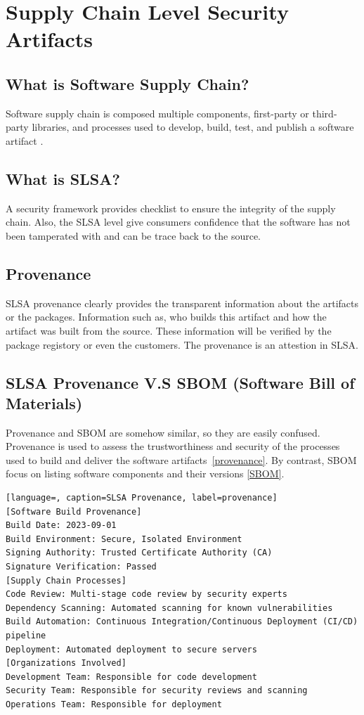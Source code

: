 \section{Supply Chain Level Security Artifacts}

\subsection{What is Software Supply Chain?}
Software supply chain is composed multiple components, first-party or third-
party libraries, and processes used to develop, build, test, and publish a software 
artifact \cite{DoDDefCI/CD2023}.

\subsection{What is SLSA?}
A security framework provides checklist to ensure the integrity of the supply chain.
Also, the SLSA level give consumers confidence that the software has not been tamperated with 
and can be trace back to the source.

\subsection{Provenance}
SLSA provenance clearly provides the transparent information about the artifacts or the packages.
Information such as, who builds this artifact and how the artifact was built from the source.
These information will be verified by the package registory or even the customers. The provenance
is an attestion in SLSA.

\subsection{SLSA Provenance V.S SBOM (Software Bill of Materials)}
Provenance and SBOM are somehow similar, so they are easily confused. Provenance is used to 
assess the trustworthiness and security of the processes used to build and deliver the software artifacts~\ref{provenance}.
By contrast, SBOM focus on listing software components and their versions \ref{SBOM}.

\begin{lstlisting}[language=, caption=SLSA Provenance, label=provenance]
[Software Build Provenance]
Build Date: 2023-09-01
Build Environment: Secure, Isolated Environment
Signing Authority: Trusted Certificate Authority (CA)
Signature Verification: Passed
[Supply Chain Processes]
Code Review: Multi-stage code review by security experts
Dependency Scanning: Automated scanning for known vulnerabilities
Build Automation: Continuous Integration/Continuous Deployment (CI/CD) pipeline
Deployment: Automated deployment to secure servers
[Organizations Involved]
Development Team: Responsible for code development
Security Team: Responsible for security reviews and scanning
Operations Team: Responsible for deployment
\end{lstlisting}

